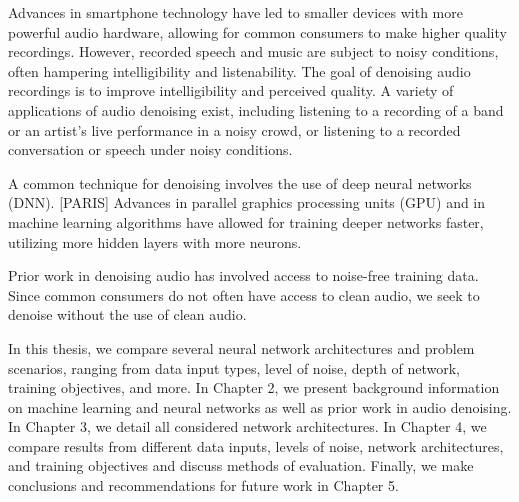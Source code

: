 Advances in smartphone technology have led to smaller devices with more powerful audio hardware, allowing for common consumers to make higher quality recordings. However, recorded speech and music are subject to noisy conditions, often hampering intelligibility and listenability. The goal of denoising audio recordings is to improve intelligibility and perceived quality. A variety of applications of audio denoising exist, including listening to a recording of a band or an artist's live performance in a noisy crowd, or listening to a recorded conversation or speech under noisy conditions.

A common technique for denoising involves the use of deep neural networks (DNN). [PARIS] Advances in parallel graphics processing units (GPU) and in machine learning algorithms have allowed for training deeper networks faster, utilizing more hidden layers with more neurons.

Prior work in denoising audio has involved access to noise-free training data. Since common consumers do not often have access to clean audio, we seek to denoise without the use of clean audio.

In this thesis, we compare several neural network architectures and problem scenarios, ranging from data input types, level of noise, depth of network, training objectives, and more. In Chapter 2, we present background information on machine learning and neural networks as well as prior work in audio denoising. In Chapter 3, we detail all considered network architectures. In Chapter 4, we compare results from different data inputs, levels of noise, network architectures, and training objectives and discuss methods of evaluation. Finally, we make conclusions and recommendations for future work in Chapter 5.
